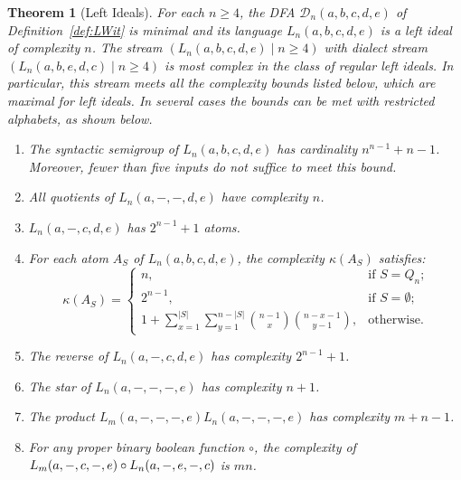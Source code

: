 \documentclass[final]{dmtcs-episciences}
\renewcommand{\ge}{\geqslant}
\newcommand{\emp}{\emptyset}
\newcommand{\be}{\begin{enumerate}}
\newcommand{\ee}{\end{enumerate}}
\newcommand{\cD}{{\mathcal D}}
\newtheorem{theorem}{Theorem}
\theoremstyle{definition}
\theoremstyle{remark}
\begin{document}
\begin{theorem}[Left Ideals]
For each $n\ge 4$, the DFA $\cD_n(a,b,c,d,e)$ of Definition~\ref{def:LWit} is minimal and its 
language $L_n(a,b,c,d,e)$ is a left ideal of complexity $n$.
The stream $(L_n(a,b,c,d,e) \mid n \ge 4)$  with dialect stream
$(L_n(a,b,e,d,c) \mid n \ge 4)$
is most complex in the class of regular left ideals.
In particular, this stream meets all the complexity bounds listed below, which are maximal for left ideals. In several cases the bounds can be met with restricted alphabets, as shown below.
\be
\item
The syntactic semigroup of $L_n(a,b,c,d,e)$ has cardinality $n^{n-1}+n-1$.  Moreover, fewer than five inputs do not suffice to meet this bound.
\item
All quotients of $L_n(a,-,-,d,e)$ have complexity $n$.
\item
$L_n(a,-,c,d,e)$ has $2^{n-1}+1$ atoms. 
\item
For each atom $A_S$ of $L_n(a,b,c,d,e)$, the complexity $\kappa(A_S)$ satisfies:
\begin{equation*}
	\kappa(A_S) =
	\begin{cases}
		 n, 			& \text{if $S=Q_n$;}\\
		2^{n-1},		& \text{if $S=\emp$;}\\
		1 + \sum_{x=1}^{|S|}\sum_{y=1}^{n-|S|}\binom{n-1}{x}\binom{n-x-1}{y-1},
		 			& \text{otherwise.}
		\end{cases}
\end{equation*}
\item
The reverse of $L_n(a,-,c,d,e)$ has complexity $2^{n-1}+1$.

\item
The star of $L_n(a,-,-,-,e)$ has complexity $n+1$.
\item
The product $L_m(a,-,-,-,e) L_n(a,-,-,-,e)$ has complexity $m+n-1$.
\item
For any proper binary boolean function $\circ$, the complexity of  $L_m(a,-,c,-,e)\\ \circ L_n(a,-,e,-,c)$
is $mn$.

\ee
\end{theorem}
\end{document}
